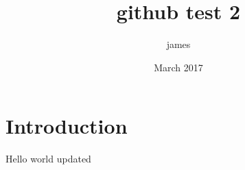 \documentclass{article}
\title{github test 2}
\author{james }
\date{March 2017}
\begin{document}
\maketitle

\section{Introduction}

Hello world updated
\end{document}
